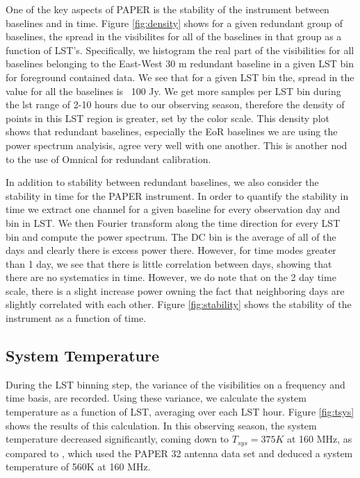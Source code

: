 \documentclass[twocolumn,numberedappendix]{emulateapj} \shorttitle{PSA64}
\begin{document}
One of the key aspects of PAPER is the stability of the instrument between
baselines and in time. Figure \ref{fig:density} shows for a given redundant
group of baselines, the spread in the visibilites for all of the baselines in
that group as a function of LST's. Specifically, we histogram the real part of
the visibilities for all baselines belonging to the East-West 30 m redundant
baseline in a given LST bin for foreground contained data. We see that for a
given LST bin the, spread in the value for all the baselines is ~100 Jy.  We get
more samples per LST bin during the lst range of 2-10 hours due to our observing
season, therefore the density of points in this LST region is greater, set by
the color scale. This density plot shows that redundant baselines, especially
the EoR baselines we are using the power spectrum analyisis, agree very well
with one another. This is another nod to the use of Omnical for redundant
calibration. 

In addition to stability between redundant baselines, we also consider the
stability in time for the PAPER instrument. In order to quantify the stability
in time we extract one channel for a given baseline for every observation day
and bin in LST. We then Fourier transform along the time direction for every LST
bin and compute the power spectrum. The DC bin is the average of all of the days
and clearly there is excess power there. However, for time modes greater than 1
day, we see that there is little correlation between days, showing that there
are no systematics in time. However, we do note that on the 2 day time scale,
there is a slight increase power owning the fact that neighboring days are
slightly correlated with each other.  Figure \ref{fig:stability} shows the
stability of the instrument as a function of time. 

\subsection{System Temperature}   
During the LST binning step, the variance of the visibilities on a frequency and
time basis, are recorded. Using these variance, we calculate the system
temperature as a function of LST, averaging over each LST hour. Figure
\ref{fig:tsys} shows the results of this calculation. In this observing season,
the system temperature decreased significantly, coming down to $T_{sys} = 375K$
at 160 MHz, as compared to \cite{parsons_et_al2014,jacobs_et_al2014a}, which
used the PAPER 32 antenna data set and deduced a system temperature of 560K at
160 MHz. 
\end{document}
